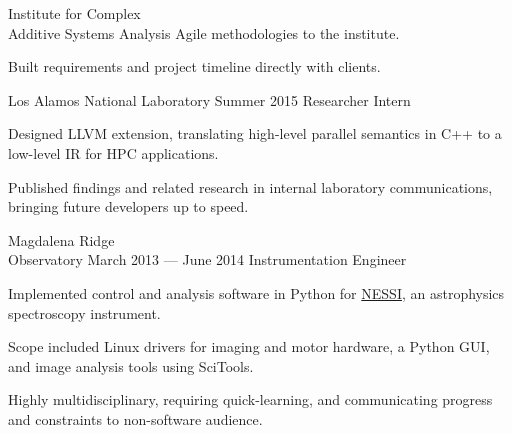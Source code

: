 \documentclass{tc_cv}
\newcommand{\jobSpace}{\vspace{0.75em}}
\begin{document}
\begin{minipage}[t]{0.6\linewidth}
\begin{job}{Institute for Complex \\ Additive Systems Analysis}
      Agile methodologies to the institute.
    \item Built requirements and project timeline directly with clients.
  \end{job}
  \jobSpace
  \begin{job}{Los Alamos National Laboratory}
    {Summer 2015}
    {Researcher Intern}
    \item Designed LLVM extension, translating high-level parallel semantics
      in C++ to a low-level IR for HPC applications.
    \item Published findings and related research in internal laboratory
      communications, bringing future developers up to speed.
  \end{job}
  \jobSpace
  \begin{job}{Magdalena Ridge \\ Observatory}
    {March 2013 --- June 2014}
    {Instrumentation Engineer}
    \item Implemented control and analysis software in Python for
      \href{https://noirlab.edu/public/programs/kitt-peak-national-observatory/wiyn-35m-telescope/nessi/}{NESSI},
      an astrophysics spectroscopy instrument.
    \item Scope included Linux drivers for imaging and motor hardware, a Python
      GUI, and image analysis tools using SciTools.
    \item Highly multidisciplinary, requiring quick-learning, and communicating
      progress and constraints to non-software audience.
  \end{job}
\end{minipage}
\end{document}

